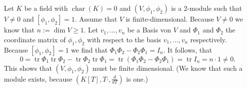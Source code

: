 \documentclass[a4paper,10pt]{article}
\newcommand{\kchar}{\operatorname{char}}
\newcommand{\tr}{\operatorname{tr}}
\begin{document}
\section{}
Let $K$ be a field with $\kchar(K) = 0$ and $(V,\phi_1,\phi_2)$ is a  $2$-module such that $V \neq 0$ and $[\phi_1, \phi_2] = 1$. Assume that $V$ is finite-dimensional. Because $V \neq 0$ we know that $n := \dim V \geq 1$. Let $v_1, \ldots, v_n$ be a Basis von $V$ and $\Phi_1$ and $\Phi_2$ the coordinate matrix of $\phi_1, \phi_2$ with respect to the basis $v_1, \ldots, v_n$ respectively. Because $[\phi_1, \phi_2] = 1$ we find that $\Phi_1 \Phi_2 - \Phi_2 \Phi_1 = I_n$. It follows, that
\[
 0
 = \tr \Phi_1 \tr \Phi_2 - \tr \Phi_2 \tr \Phi_1
 = \tr (\Phi_1\Phi_2-\Phi_2\Phi_1)
 = \tr I_n
 = n \cdot 1
 \neq 0.
\]
This shows that $(V,\phi_1,\phi_2)$ must be finite dimensional. (We know that such a module exists, because $\left(K[T], T\cdot, \frac{d}{dT}\right)$ is one.)
\end{document}
